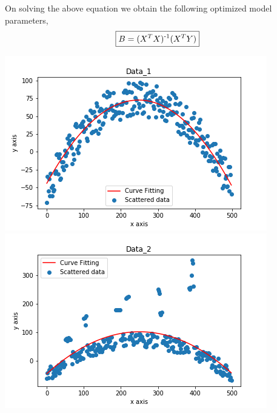 \documentclass{article}
\begin{document}
On solving the above equation we obtain the following optimized model parameters,
\begin{equation}
\boxed{B = (X^TX)\textsuperscript{-1}(X^TY)}
\end{equation}
\begin{center}
    \includegraphics{least_square_regularization_data_1.png}
    \includegraphics{least_square_regularization_data_2.png}
\end{center}
\end{document}
